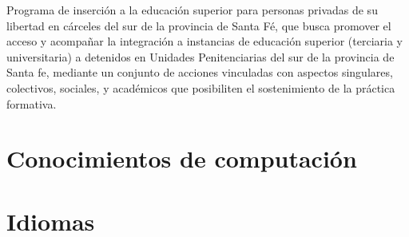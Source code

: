 \documentclass[11pt,a4paper,sans]{moderncv}        %
\begin{document}
\vspace{2mm}

  {
    Programa de inserción a la educación superior para personas privadas de su libertad en cárceles del sur de la provincia de Santa Fé, que busca promover el acceso y acompañar la integración a instancias de educación superior (terciaria y universitaria) a detenidos en Unidades Penitenciarias del sur de la provincia de Santa fe, mediante un conjunto de acciones vinculadas con aspectos singulares, colectivos, sociales, y académicos que posibiliten el sostenimiento de la práctica formativa.
  }

\vspace{2mm}

\section{Conocimientos de computaci\'on}
\vspace{2mm}

\section{Idiomas}

\vspace{2mm}

\end{document}
